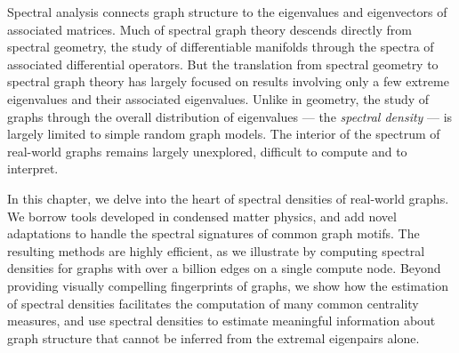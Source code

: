 Spectral analysis connects graph structure to the eigenvalues and eigenvectors
of associated matrices.  Much of spectral graph theory descends directly from
spectral geometry, the study of differentiable manifolds through the spectra of
associated differential operators.  But the translation from spectral geometry
to spectral graph theory has largely focused on results involving only a few
extreme eigenvalues and their associated eigenvalues.  Unlike in geometry, the
study of graphs through the overall distribution of eigenvalues --- the {\em
spectral density} --- is largely limited to simple random graph models.  The
interior of the spectrum of real-world graphs remains largely unexplored,
difficult to compute and to interpret.

In this chapter, we delve into the heart of spectral densities of real-world
graphs.  We borrow tools developed in condensed matter physics, and add novel
adaptations to handle the spectral signatures of common graph motifs.  The
resulting methods are highly efficient, as we illustrate by computing spectral
densities for graphs with over a billion edges on a single compute node. Beyond
providing visually compelling fingerprints of graphs, we show how the 
estimation of spectral densities facilitates the computation of many common
centrality measures, and use spectral densities to estimate meaningful
information about graph structure that cannot be inferred from the extremal
eigenpairs alone.